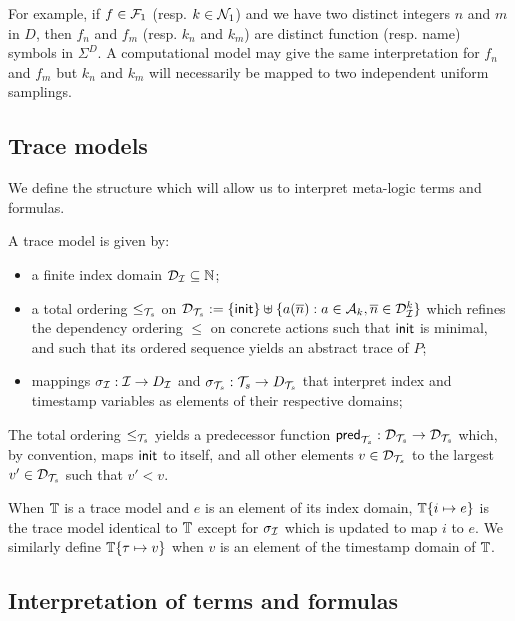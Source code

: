 For example, if $f \in \mathcal{F}_1$ (resp. $k \in \mathcal{N}_1$) and we have two distinct
integers $n$ and $m$ in $D$, then $f_n$ and $f_m$ (resp. $k_n$ and $k_m$)
are distinct function (resp. name) symbols in $\Sigma^D$.
A computational model may give the same interpretation for $f_n$ and $f_m$
but $k_n$ and $k_m$ will necessarily be mapped to two independent uniform
samplings.

\subsection{Trace models}

We define the structure which will allow us to interpret meta-logic
terms and formulas.

\begin{definition}
  A trace model is given by:
  \begin{itemize}
    \item a finite index domain $\mathcal{D}_{\mathcal{I}} \subseteq \mathbb{N}$;
    \item a total ordering $\leq_{\mathcal{T}_s}$ on
      $\mathcal{D}_{\mathcal{T}_s} := \{ \mathsf{init} \} \uplus \{ a(\overline{n}) : a\in\mathcal{A}_k, \overline{n}\in\mathcal{D}_{\mathcal{I}}^k
      \}$ which refines the dependency ordering $\leq$ on concrete actions such
      that $\mathsf{init}$ is minimal, and such that its ordered sequence yields an
      abstract trace of $P$;
    \item mappings $\sigma_{\mathcal{I}} : \mathcal{I} \to D_{\mathcal{I}}$
      and $\sigma_{\mathcal{T}_s} : {\mathcal{T}_s} \to D_{\mathcal{T}_s}$ that interpret index and
      timestamp variables as elements of their respective domains;
  \end{itemize}
\end{definition}

The total ordering $\leq_{\mathcal{T}_s}$ yields a predecessor function
$\mathsf{pred}_{\mathcal{T}_s} : \mathcal{D}_{\mathcal{T}_s}\to\mathcal{D}_{\mathcal{T}_s}$ which,
by convention, maps $\mathsf{init}$ to itself,
and all other elements $v \in \mathcal{D}_{\mathcal{T}_s}$ to the largest $v' \in \mathcal{D}_{\mathcal{T}_s}$ such that
$v' < v$.

When $\mathbb{T}$ is a trace model and $e$ is an element of its index domain,
$\mathbb{T}\{i\mapsto e\}$ is the trace model identical to $\mathbb{T}$ except for
$\sigma_{\mathcal{I}}$ which is updated to map $i$ to $e$. We similarly define
$\mathbb{T}\{\tau\mapsto v\}$ when $v$ is an element of the timestamp domain of $\mathbb{T}$.

\subsection{Interpretation of terms and formulas}

\newcommand{\interp}[1]{(#1)}

